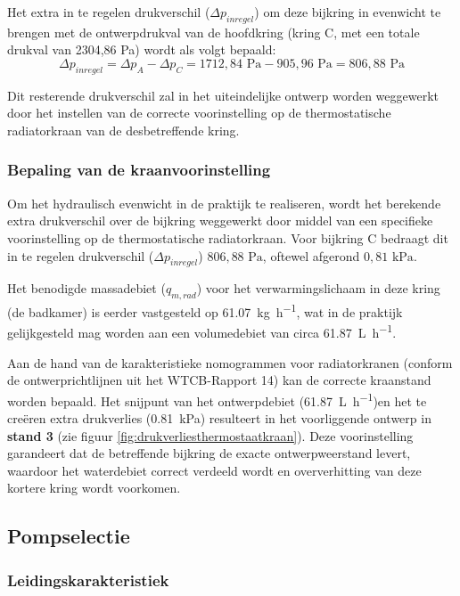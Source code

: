 \documentclass[a4paper,12pt]{article}
\begin{document}
Het extra in te regelen drukverschil ($\Delta p_{inregel}$) om deze bijkring in evenwicht te brengen met de ontwerpdrukval van de hoofdkring (kring C, met een totale drukval van 2304,86 Pa) wordt als volgt bepaald:
\begin{equation}
    \Delta p_{inregel} = \Delta p_{A} - \Delta p_{C} = 1712,84 \text{ Pa} - 905,96 \text{ Pa} = 806,88 \text{ Pa}
\end{equation}

Dit resterende drukverschil zal in het uiteindelijke ontwerp worden weggewerkt door het instellen van de correcte voorinstelling op de thermostatische radiatorkraan van de desbetreffende kring.

\subsubsection{Bepaling van de kraanvoorinstelling}

Om het hydraulisch evenwicht in de praktijk te realiseren, wordt het berekende extra drukverschil over de bijkring weggewerkt door middel van een specifieke voorinstelling op de thermostatische radiatorkraan. Voor bijkring C bedraagt dit in te regelen drukverschil ($\Delta p_{inregel}$) $806,88 \text{ Pa}$, oftewel afgerond $0,81 \text{ kPa}$. 

Het benodigde massadebiet ($q_{m,rad}$) voor het verwarmingslichaam in deze kring (de badkamer) is eerder vastgesteld op \qty{61,07}{\kilo\gram\per\hour}, wat in de praktijk gelijkgesteld mag worden aan een volumedebiet van circa \qty{61,87}{\liter\per\hour}. 

Aan de hand van de karakteristieke nomogrammen voor radiatorkranen (conform de ontwerprichtlijnen uit het WTCB-Rapport 14) kan de correcte kraanstand worden bepaald. Het snijpunt van het ontwerpdebiet (\qty{61,87}{\liter\per\hour})en het te creëren extra drukverlies (\qty{0,81}{\kilo\pascal}) resulteert in het voorliggende ontwerp in \textbf{stand 3} (zie figuur \ref{fig:drukverliesthermostaatkraan}). Deze voorinstelling garandeert dat de betreffende bijkring de exacte ontwerpweerstand levert, waardoor het waterdebiet correct verdeeld wordt en oververhitting van deze kortere kring wordt voorkomen.

\subsection{Pompselectie}
 \subsubsection{Leidingskarakteristiek}
\end{document}
